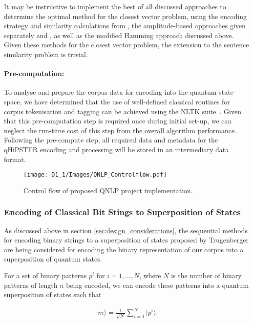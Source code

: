 It may be instructive to implement the best of all discussed approaches to determine the optimal method for the closest vector problem, using the encoding strategy and similarity calculations from \cite{Trugenberger_2001,Trugenberger_2002}, the amplitude-based approaches given separately \cite{Schuld_Sinayskiy_Petruccione_2014} and \cite{Wiebe_Kapoor_Svore_2014}, as well as the modified Hamming approach discussed above. Given these methods for the closest vector problem, the extension to the sentence similarity problem is trivial. 
\paragraph{Pre-computation:}
To analyse and prepare the corpus data for encoding into the quantum state-space, we have determined that the use of well-defined classical routines for corpus tokenisation and tagging can be achieved using the NLTK suite~\cite{BirdKleinLoper09}. Given that this pre-computation step is required once during initial set-up, we can neglect the run-time cost of this step from the overall algorithm performance. Following the pre-compute step, all required data and metadata for the qHiPSTER encoding and processing will be stored in an intermediary data format.

\begin{figure}[H]
    \centering
    \texttt{[image: D1\_1/Images/QNLP\_Controlflow.pdf]}
    \caption{Control flow of proposed QNLP project implementation.}
    \label{fig:qnlp_controlflow}
\end{figure}


\subsubsection{Encoding of Classical Bit Stings to Superposition of States}
\label{sec:encoding_trugenberger}
As discussed above in section \ref{sec:design_considerations}, the sequential methods for encoding binary strings to a superposition of states proposed by Trugenberger \cite{Trugenberger_2001,Trugenberger_2002} are being considered for encoding the binary representation of our corpus into a superposition of quantum states.

For a set of binary patterns $p^i$ for $i=1,\dots,N$, where $N$ is the number of binary patterns of length $n$ being encoded, we can encode these patterns into a quantum superposition of states such that

\begin{align}
    \label{eqn:superposition_state}
    \vert m \rangle = \frac{1}{\sqrt{N}}\sum\limits_{i=1}^ {N} \vert p^i \rangle.
\end{align}

